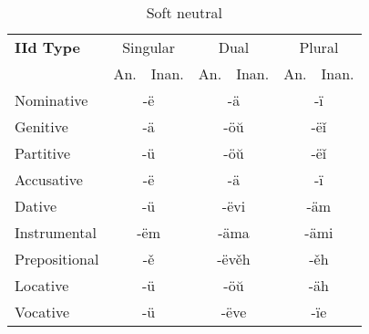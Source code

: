 \begin{table}[!htb]
	\caption{Soft neutral}
	\begin{tabular}{lllllll}
		\textbf{IId Type}       
		& \multicolumn{2}{c}{Singular} 
		& \multicolumn{2}{c}{Dual} 
		& \multicolumn{2}{c}{Plural} \\
		& An.   & Inan.  & An.   & Inan.   & An.  & Inan. \\
		Nominative    & \multicolumn{2}{c}{-ë}      
		& \multicolumn{2}{c}{-ä}        
		& \multicolumn{2}{c}{-ï} \\
		Genitive      & \multicolumn{2}{c}{-ä}       
		& \multicolumn{2}{c}{-öŭ}      
		& \multicolumn{2}{c}{-ëǐ}   \\
		Partitive     & \multicolumn{2}{c}{-ü}       
		& \multicolumn{2}{c}{-öŭ}      
		& \multicolumn{2}{c}{-ëǐ} \\
		Accusative    & \multicolumn{2}{c}{-ë}     
		& \multicolumn{2}{c}{-ä} 
		& \multicolumn{2}{c}{-ï} \\
		Dative		  & \multicolumn{2}{c}{-ü}       
		& \multicolumn{2}{c}{-ëvi}     
		& \multicolumn{2}{c}{-äm} \\
		Instrumental  & \multicolumn{2}{c}{-ëm}     
		& \multicolumn{2}{c}{-äma}     
		& \multicolumn{2}{c}{-ämi} \\
		Prepositional & \multicolumn{2}{c}{-ě}       
		& \multicolumn{2}{c}{-ëvěh}     
		& \multicolumn{2}{c}{-ěh} \\
		Locative      & \multicolumn{2}{c}{-ü}      
		& \multicolumn{2}{c}{-öŭ}       
		& \multicolumn{2}{c}{-äh} \\ 
		Vocative      & \multicolumn{2}{c}{-ü}       
		& \multicolumn{2}{c}{-ëve}      
		& \multicolumn{2}{c}{-ïe}
	\end{tabular}
\end{table}

